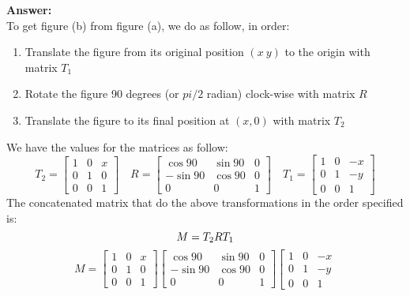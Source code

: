 \documentclass[13pt]{letter}
\begin{document}
\begin{enumerate}
  \textbf{Answer:} \\
  To get figure (b) from figure (a), we do as follow, in order:
  \begin{enumerate}
    \item Translate the figure from its original position $(x~y)$ to the origin with matrix $T_1$
    \item Rotate the figure 90 degrees (or $pi/2$ radian) clock-wise with matrix $R$
    \item Translate the figure to its final position at $(x, 0)$ with matrix $T_2$
  \end{enumerate}
  We have the values for the matrices as follow:
  $$
  T_2 = \left[
  \begin{array}{ccc}
    1 & 0 & x \\
    0 & 1 & 0 \\
    0 & 0 & 1
  \end{array}
  \right]
  \hspace{12pt}
  R = \left[
  \begin{array}{ccc}
     \cos{90} &  \sin{90} & 0 \\
    -\sin{90} &  \cos{90} & 0 \\
            0 &         0 & 1
  \end{array}
  \right]
  \hspace{12pt}
  T_1 = \left[
  \begin{array}{ccc}
    1 &  0 & -x \\
    0 &  1 & -y \\
    0 &  0 &  1
  \end{array}
  \right]
  $$
  The concatenated matrix that do the above transformations in the order specified is:
  $$ M = T_2RT_1 \linebreak $$
  $$ M = \left[
  \begin{array}{ccc}
    1 & 0 & x \\
    0 & 1 & 0 \\
    0 & 0 & 1
  \end{array}
  \right]
  \left[
  \begin{array}{ccc}
     \cos{90} &  \sin{90} & 0 \\
    -\sin{90} &  \cos{90} & 0 \\
            0 &         0 & 1
  \end{array}
  \right]
  \left[
  \begin{array}{ccc}
    1 &  0 & -x \\
    0 &  1 & -y \\
    0 &  0 &  1
  \end{array}
$$
\end{enumerate}
\end{document}
